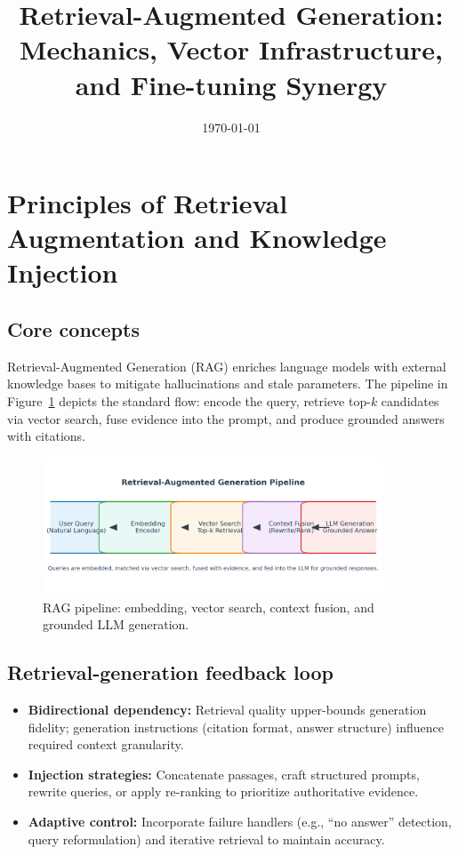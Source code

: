 \documentclass{article}
\title{Retrieval-Augmented Generation: Mechanics, Vector Infrastructure, and Fine-tuning Synergy}
\author{}
\date{\today}
\begin{document}
\maketitle

\section{Principles of Retrieval Augmentation and Knowledge Injection}
\subsection{Core concepts}
Retrieval-Augmented Generation (RAG) enriches language models with external knowledge bases to mitigate hallucinations and stale parameters. The pipeline in Figure~\ref{fig:rag_pipeline_en} depicts the standard flow: encode the query, retrieve top-$k$ candidates via vector search, fuse evidence into the prompt, and produce grounded answers with citations.
\begin{figure}[H]
  \centering
  \includegraphics[width=0.9\textwidth]{rag_pipeline.png}
  \caption{RAG pipeline: embedding, vector search, context fusion, and grounded LLM generation.}
  \label{fig:rag_pipeline_en}
\end{figure}

\subsection{Retrieval-generation feedback loop}
\begin{itemize}
  \item \textbf{Bidirectional dependency:} Retrieval quality upper-bounds generation fidelity; generation instructions (citation format, answer structure) influence required context granularity.
  \item \textbf{Injection strategies:} Concatenate passages, craft structured prompts, rewrite queries, or apply re-ranking to prioritize authoritative evidence.
  \item \textbf{Adaptive control:} Incorporate failure handlers (e.g., “no answer” detection, query reformulation) and iterative retrieval to maintain accuracy.
\end{itemize}
\end{document}
